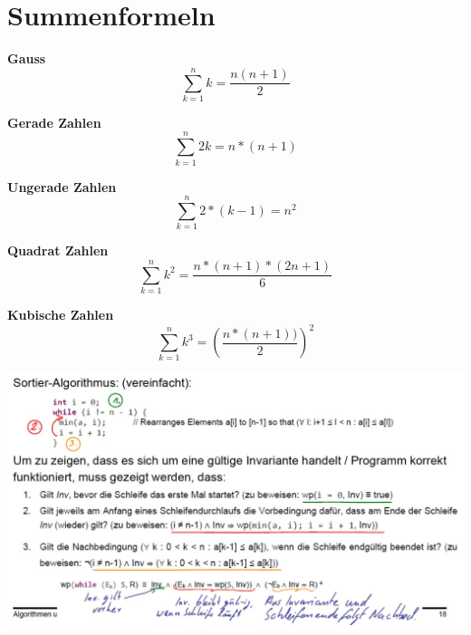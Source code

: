 \section*{Summenformeln}

\textbf{Gauss}
\begin{equation}
    \sum_{k=1}^{n} k = \frac{n(n+1)}{2}
\end{equation}

\textbf{Gerade Zahlen}
\begin{equation}
    \sum_{k=1}^{n} 2k = n*(n+1)
\end{equation}

\textbf{Ungerade Zahlen}
\begin{equation}
    \sum_{k=1}^{n} 2*(k-1) = n^2
\end{equation}

\textbf{Quadrat Zahlen}
\begin{equation}
    \sum_{k=1}^{n} k^2 = \frac{n*(n+1)*(2n+1)}{6}
\end{equation}

\textbf{Kubische Zahlen}
\begin{equation}
    \sum_{k=1}^{n} k^3 = (\frac{n*(n+1))}{2})^2
\end{equation}

\includegraphics[width=\linewidth]{images/invariante}